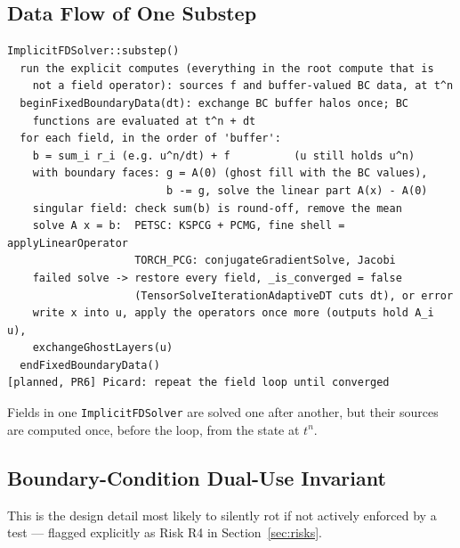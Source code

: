 \documentclass[11pt]{article}
\newenvironment{schematic}{%
  \begin{tcolorbox}[breakable, colback=codebg, colframe=gray!40, boxrule=0.4pt, arc=1mm, left=4mm, right=4mm, top=2mm, bottom=2mm]
  \ttfamily\footnotesize
}{%
  \end{tcolorbox}
}
\begin{document}
\subsection{Data Flow of One Substep}

\begin{schematic}
\begin{verbatim}
ImplicitFDSolver::substep()
  run the explicit computes (everything in the root compute that is
    not a field operator): sources f and buffer-valued BC data, at t^n
  beginFixedBoundaryData(dt): exchange BC buffer halos once; BC
    functions are evaluated at t^n + dt
  for each field, in the order of 'buffer':
    b = sum_i r_i (e.g. u^n/dt) + f          (u still holds u^n)
    with boundary faces: g = A(0) (ghost fill with the BC values),
                         b -= g, solve the linear part A(x) - A(0)
    singular field: check sum(b) is round-off, remove the mean
    solve A x = b:  PETSC: KSPCG + PCMG, fine shell = applyLinearOperator
                    TORCH_PCG: conjugateGradientSolve, Jacobi
    failed solve -> restore every field, _is_converged = false
                    (TensorSolveIterationAdaptiveDT cuts dt), or error
    write x into u, apply the operators once more (outputs hold A_i u),
    exchangeGhostLayers(u)
  endFixedBoundaryData()
[planned, PR6] Picard: repeat the field loop until converged
\end{verbatim}
\end{schematic}

Fields in one \texttt{ImplicitFDSolver} are solved one after another, but
their sources are computed once, before the loop, from the state at $t^n$.

\subsection{Boundary-Condition Dual-Use Invariant}

This is the design detail most likely to silently rot if not actively
enforced by a test --- flagged explicitly as Risk R4 in
Section~\ref{sec:risks}.
\end{document}

